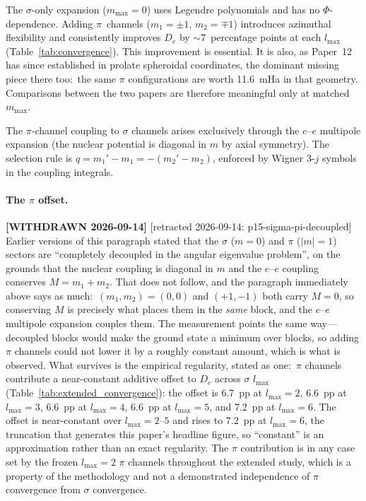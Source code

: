 \documentclass[aps,pra,twocolumn,superscriptaddress,longbibliography]{revtex4-2}
\begin{document}
The $\sigma$-only expansion ($m_{\max}=0$) uses Legendre polynomials
and has no $\Phi$-dependence.  Adding $\pi$~channels
($m_1 = \pm 1$, $m_2 = \mp 1$) introduces azimuthal flexibility
and consistently improves $D_e$ by ${\sim}7$~percentage points
at each $l_{\max}$ (Table~\ref{tab:convergence}).
This improvement is essential.  It is also, as Paper~12 has since
established in prolate spheroidal coordinates, the dominant missing
piece there too:\ the same $\pi$ configurations are worth 11.6~mHa
in that geometry.  Comparisons between the two papers are therefore
meaningful only at matched $m_{\max}$.

The $\pi$-channel coupling to $\sigma$ channels arises exclusively
through the $e$--$e$ multipole expansion (the nuclear potential is
diagonal in $m$ by axial symmetry).  The selection rule is
$q = m_1' - m_1 = -(m_2' - m_2)$, enforced by Wigner 3-$j$ symbols
in the coupling integrals.

\paragraph{The $\pi$ offset.}
\textbf{[WITHDRAWN 2026-09-14]}
[retracted 2026-09-14: p15-sigma-pi-decoupled]  Earlier versions of this
paragraph stated that the $\sigma$ ($m = 0$) and $\pi$ ($|m| = 1$) sectors are
``completely decoupled in the angular eigenvalue problem'', on the
grounds that the nuclear coupling is diagonal in $m$ and the $e$--$e$
coupling conserves $M = m_1 + m_2$.  That does not follow, and the
paragraph immediately above says as much:\ $(m_1, m_2) = (0,0)$ and
$(+1,-1)$ both carry $M = 0$, so conserving $M$ is precisely what places
them in the \emph{same} block, and the $e$--$e$ multipole expansion
couples them.  The measurement points the same way---decoupled blocks
would make the ground state a minimum over blocks, so adding $\pi$
channels could not lower it by a roughly constant amount, which is what
is observed.  What survives is the empirical regularity, stated as one:\
$\pi$ channels contribute a near-constant additive offset to $D_e$
across $\sigma$ $l_{\max}$ (Table~\ref{tab:extended_convergence}):
the offset is 6.7~pp at $l_{\max} = 2$, 6.6~pp at $l_{\max} = 3$,
6.6~pp at $l_{\max} = 4$, 6.6~pp at $l_{\max} = 5$, and
7.2~pp at $l_{\max} = 6$.
The offset is near-constant over $l_{\max} = 2$--$5$ and rises to
$7.2$~pp at $l_{\max} = 6$, the truncation that generates this paper's
headline figure, so ``constant'' is an approximation rather than an
exact regularity.  The $\pi$ contribution is in any case set by the
frozen $l_{\max} = 2$ $\pi$ channels throughout the extended study,
which is a property of the methodology and not a demonstrated
independence of $\pi$ convergence from $\sigma$ convergence.
\end{document}
